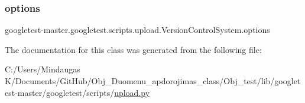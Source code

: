 \subsubsection{\texorpdfstring{options}{options}}
{\footnotesize\ttfamily googletest-\/master.\+googletest.\+scripts.\+upload.\+Version\+Control\+System.\+options}



The documentation for this class was generated from the following file\+:\begin{DoxyCompactItemize}
\item 
C\+:/\+Users/\+Mindaugas K/\+Documents/\+Git\+Hub/\+Obj\+\_\+\+Duomenu\+\_\+apdorojimas\+\_\+class/\+Obj\+\_\+test/lib/googletest-\/master/googletest/scripts/\mbox{\hyperlink{_obj__test_2lib_2googletest-master_2googletest_2scripts_2upload_8py}{upload.\+py}}\end{DoxyCompactItemize}
